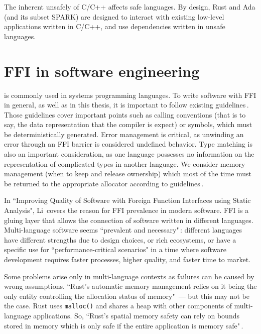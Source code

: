 \documentclass[nomenclature, english, bibtex]{kththesis}
\begin{document}
The inherent unsafely of C/C++ affects safe languages. By design, Rust and Ada (and its subset SPARK) are designed to interact with existing low-level applications written in C/C++, and use dependencies written in unsafe languages. 

\section[FFI in software engineering]{FFI in software engineering}

 is commonly used in systems programming languages. 
To write software with FFI in general, as well as in this thesis, it is important to follow existing guidelines\,\cite{gjengset_rust_2021, noauthor_ffi_nodate, noauthor_multi-language_nodate}. 
Those guidelines cover important points such as calling conventions (that is to say, the data representation that the compiler is expect) or symbols, which must be deterministically generated. Error management is critical, as unwinding an error through an FFI barrier is considered undefined behavior. Type matching is also an important consideration, as one language possesses no information on the representation of complicated types in another language. We consider memory management (when to keep and release ownership) which most of the time must be returned to the appropriate allocator according to guidelines\,\cite{gjengset_rust_2021}. 

In ``Improving Quality of Software with Foreign Function Interfaces using Static Analysis", Li\,\cite{li_improving_2014} covers the reason for FFI prevalence in modern software. FFI is a gluing layer that allows the connection of software written in different languages. Multi-language software seems ``prevalent and necessary"\,\cite{li_detecting_2022}: different languages have different strengths due to design choices, or rich ecosystems, or have a specific use for ``performance-critical scenarios" in a time where software development requires faster processes, higher quality, and faster time to market.

Some problems arise only in multi-language contexts as failures can be caused by wrong assumptions. ``Rust’s automatic memory management relies on it being the only entity controlling the allocation status of memory"\,\cite{mergendahl_cross-language_2022} --- but this may not be the case. Rust uses \texttt{malloc()} and shares a heap with other components of multi-language applications. So, ``Rust’s spatial memory safety can rely on bounds stored in memory which is only safe if the entire application is memory safe"\,\cite{mergendahl_cross-language_2022}.
\end{document}
